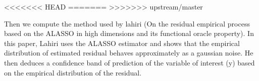 \documentclass[11pt,oneside, a4paper]{amsart}\usepackage[]{graphicx}\usepackage[]{color}
\begin{document}
<<<<<<< HEAD
=======
>>>>>>> upstream/master
\begin{table}[ht]
\centering
\caption{Simulation Result} 
\label{Test_table}
{\footnotesize
{}
}
\end{table}




Then we compute the method used by lahiri (On the residual empirical process based on the ALASSO in high dimensions and its functional oracle property). In this paper, Lahiri uses the ALASSO estimator and shows that the empirical distribution of estimated residual behaves approximately as a gaussian noise. He then deduces a confidence band of prediction of the variable of interest (y) based on the empirical distribution of the residual.
\end{document}
